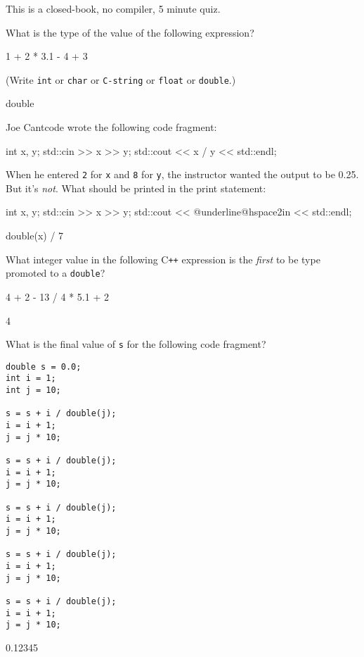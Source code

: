 

This is a closed-book, no compiler, 5 minute quiz.

\nextq
What is the type of the value of the following expression?
\begin{console}[fontsize=\small]
1 + 2 * 3.1 - 4 + 3
\end{console}
(Write \verb!int! or \verb!char! or \verb!C-string! or \verb!float! or
\verb!double!.)
\\
\ANSWER
\begin{answercode}
double
\end{answercode}

\nextq
Joe Cantcode wrote the following code fragment:
\begin{console}[commandchars=\@\{\},fontsize=\small]
int x, y;
std::cin >> x >> y;
std::cout << x / y << std::endl;
\end{console}
When he entered \verb!2! for \verb!x! and \verb!8! for \verb!y!,
the instructor wanted
the output to be 0.25.
But it's \textit{not}.
What should be printed in the print statement:
\begin{console}[commandchars=\@\{\},fontsize=\small]
int x, y;
std::cin >> x >> y;
std::cout << @underline{@hspace{2in}} << std::endl;
\end{console}
\ANSWER
\begin{answercode}
double(x) / 7
\end{answercode}

\nextq
What integer value in the following
C\texttt{++}
expression is the \textit{first} to be type promoted to a \texttt{double}?
\begin{console}[commandchars=\\\{\},fontsize=\small]
4 + 2 - 13 / 4 * 5.1 + 2
\end{console}
\ANSWER
\begin{answercode}
4
\end{answercode}

\nextq
What is the final value of \verb!s! for the following code fragment?
\begin{Verbatim}[fontsize=\footnotesize,frame=single]
double s = 0.0;
int i = 1;
int j = 10;

s = s + i / double(j);
i = i + 1;
j = j * 10;

s = s + i / double(j);
i = i + 1;
j = j * 10;

s = s + i / double(j);
i = i + 1;
j = j * 10;

s = s + i / double(j);
i = i + 1;
j = j * 10;

s = s + i / double(j);
i = i + 1;
j = j * 10;
\end{Verbatim}
\ANSWER
\begin{answercode}
0.12345
\end{answercode}


